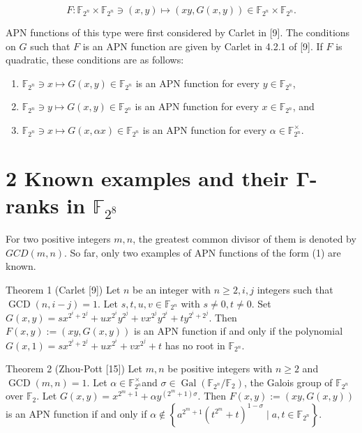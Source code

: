\documentclass[10pt]{article}
\begin{document}
\begin{equation*}
F: \mathbb{F}_{2^{n}} \times \mathbb{F}_{2^{n}} \ni(x, y) \mapsto(x y, G(x, y)) \in \mathbb{F}_{2^{n}} \times \mathbb{F}_{2^{n}} . \tag{1}
\end{equation*}


APN functions of this type were first considered by Carlet in [9]. The conditions on $G$ such that $F$ is an APN function are given by Carlet in 4.2.1 of [9]. If $F$ is quadratic, these conditions are as follows:

\begin{enumerate}
  \item $\mathbb{F}_{2^{n}} \ni x \mapsto G(x, y) \in \mathbb{F}_{2^{n}}$ is an APN function for every $y \in \mathbb{F}_{2^{n}}$,
  \item $\mathbb{F}_{2^{n}} \ni y \mapsto G(x, y) \in \mathbb{F}_{2^{n}}$ is an APN function for every $x \in \mathbb{F}_{2^{n}}$, and
  \item $\mathbb{F}_{2^{n}} \ni x \mapsto G(x, \alpha x) \in \mathbb{F}_{2^{n}}$ is an APN function for every $\alpha \in \mathbb{F}_{2^{n}}^{\times}$.
\end{enumerate}

\section*{2 Known examples and their $\boldsymbol{\Gamma}$-ranks in $\mathbb{F}_{2^{8}}$}
For two positive integers $m, n$, the greatest common divisor of them is denoted by $G C D(m, n)$. So far, only two examples of APN functions of the form (1) are known.

Theorem 1 (Carlet [9]) Let $n$ be an integer with $n \geq 2, i, j$ integers such that $\operatorname{GCD}(n, i- j)=1$. Let $s, t, u, v \in \mathbb{F}_{2^{n}}$ with $s \neq 0, t \neq 0$. Set $G(x, y)=s x^{2^{i}+2^{j}}+u x^{2^{i}} y^{2^{j}}+v x^{2^{j}} y^{2^{i}}+ t y^{2^{i}+2^{j}}$. Then $F(x, y):=(x y, G(x, y))$ is an APN function if and only if the polynomial $G(x, 1)=s x^{2^{i}+2^{j}}+u x^{2^{i}}+v x^{2^{j}}+t$ has no root in $\mathbb{F}_{2^{n}}$.

Theorem 2 (Zhou-Pott [15]) Let $m, n$ be positive integers with $n \geq 2$ and $\operatorname{GCD}(m, n)=1$. Let $\alpha \in \mathbb{F}_{2^{n}}^{\times}$and $\sigma \in \operatorname{Gal}\left(\mathbb{F}_{2^{n}} / \mathbb{F}_{2}\right)$, the Galois group of $\mathbb{F}_{2^{n}}$ over $\mathbb{F}_{2}$. Let $G(x, y)= x^{2^{m}+1}+\alpha y^{\left(2^{m}+1\right) \sigma}$. Then $F(x, y):=(x y, G(x, y))$ is an APN function if and only if $\alpha \notin \left\{a^{2^{m}+1}\left(t^{2^{m}}+t\right)^{1-\sigma} \mid a, t \in \mathbb{F}_{2^{n}}\right\}$.
\end{document}
